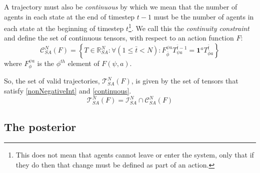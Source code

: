 \documentclass{article}
\begin{document}
A trajectory must also be \textit{continuous} by which we mean that the number of agents in each state at the end of timestep $t-1$ must be the number of agents in each state at the beginning of timestep $t$\footnote{This does not mean that agents cannot leave or enter the system, only that if they do then that change must be defined as part of an action.}. We call this the \textit{continuity constraint} and define the set of continuous tensors, with respect to an action function $F$:
\begin{equation}
\mathcal{C}^N_{SA}(F) = \left\{T\in\mathbb{R}^N_{SA}:  \forall \left(  1 \le \bar t < N\right): F^{\psi a}_{\bar\phi} T^{\bar t-1}_{\psi a} = \mathbf{1}^aT^{\bar t}_{\bar\phi a}\right\}
\label{continuous}
\end{equation}
where $F^{\psi a}_\phi$ is the $\phi^{th}$ element of $F(\psi,a)$.


So, the set of valid trajectories, $\mathcal{T}^N_{SA}(F)$, is given by the set of tensors that satisfy \eqref{nonNegativeInt} and \eqref{continuous}.
\begin{equation}
\mathcal{T}^N_{SA}(F) = \mathcal{I}^N_{SA} \cap \mathcal{C}^N_{SA}(F)
\label{SetOfTrajectories}
\end{equation}


\subsection{The posterior}
\end{document}
